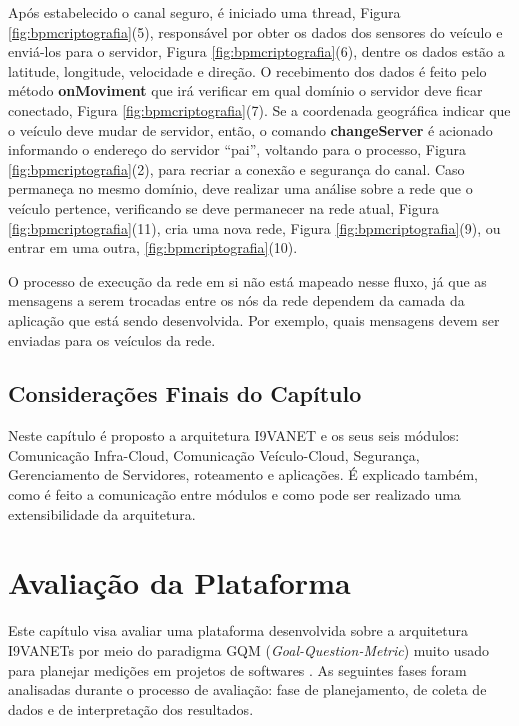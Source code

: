 \documentclass[
	12pt,				%
	oneside,			%
	a4paper,			%
	english,			%
	brazil				%
	]{abntex2ppgsi}
\begin{document}
Após estabelecido o canal seguro, é iniciado uma thread, Figura \ref{fig:bpmcriptografia}(5), responsável por obter os dados dos sensores do veículo e enviá-los para o servidor, Figura \ref{fig:bpmcriptografia}(6), dentre os dados estão a latitude, longitude, velocidade e direção. O recebimento dos dados é feito pelo método \textbf{onMoviment} que irá verificar em qual domínio o servidor deve ficar conectado, Figura \ref{fig:bpmcriptografia}(7). Se a coordenada geográfica indicar que o veículo deve mudar de servidor, então, o comando \textbf{changeServer} é acionado informando o endereço do servidor ``pai'', voltando para o processo, Figura \ref{fig:bpmcriptografia}(2), para recriar a conexão e segurança do canal. Caso permaneça no mesmo domínio, deve realizar uma análise sobre a rede que o veículo pertence, verificando se deve permanecer na rede atual, Figura  \ref{fig:bpmcriptografia}(11), cria uma  nova rede, Figura \ref{fig:bpmcriptografia}(9), ou entrar em uma outra,  \ref{fig:bpmcriptografia}(10).

O processo de execução da rede em si não está mapeado nesse fluxo, já que as mensagens a serem trocadas entre os nós da rede dependem da camada da aplicação que está sendo desenvolvida. Por exemplo,  quais mensagens devem ser enviadas para os veículos da rede.   

\section{Considerações Finais do Capítulo}
Neste capítulo é proposto a arquitetura I9VANET e os seus seis módulos: Comunicação Infra-Cloud, Comunicação Veículo-Cloud, Segurança, Gerenciamento de Servidores, roteamento e aplicações. É explicado também, como é feito a comunicação entre módulos e como pode ser realizado uma extensibilidade da arquitetura.

\chapter{Avaliação da Plataforma}\label{sec:avaliacaoArquitetura}


Este capítulo visa avaliar uma plataforma desenvolvida sobre a arquitetura I9VANETs  por meio do paradigma GQM (\textit{Goal-Question-Metric}) muito usado para planejar medições em projetos de softwares \cite{van2002goal}. As seguintes fases foram analisadas durante o processo de avaliação: fase de planejamento, de coleta de dados e de interpretação dos resultados.
\end{document}
